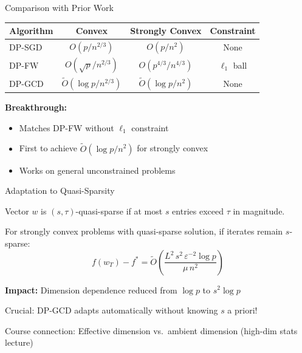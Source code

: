 \documentclass{beamer}
\begin{document}
\begin{frame}{Comparison with Prior Work}
\begin{table}
\begin{tabular}{l|c|c|c}
\textbf{Algorithm} & \textbf{Convex} & \textbf{Strongly Convex} & \textbf{Constraint} \\ \hline
DP-SGD & $O(p/n^{2/3})$ & $O(p/n^2)$ & None \\
DP-FW & $O(\sqrt{p}/n^{2/3})$ & $O(p^{4/3}/n^{4/3})$ & $\ell_1$ ball \\
\rowcolor{yellow!30}
DP-GCD & $\widetilde{O}(\log p/n^{2/3})$ & $\widetilde{O}(\log p/n^2)$ & None \\
\end{tabular}
\end{table}

\vspace{1em}

\textbf{Breakthrough:}
\begin{itemize}
\item Matches DP-FW without $\ell_1$ constraint
\item First to achieve $\widetilde{O}(\log p / n^2)$ for strongly convex
\item Works on general unconstrained problems
\end{itemize}
\end{frame}

\begin{frame}{Adaptation to Quasi-Sparsity}
\begin{definition}
Vector $w$ is $(s, \tau)$-quasi-sparse if at most $s$ entries exceed $\tau$ in magnitude.
\end{definition}

\vspace{1em}

\begin{theorem}
For strongly convex problems with quasi-sparse solution, if iterates remain $s$-sparse:
\[
f(w_T) - f^* = \widetilde{O}\!\left( \frac{L^2 \, s^2 \, \varepsilon^{-2} \log p}{\mu \, n^2} \right)
\]
\end{theorem}

\vspace{1em}

\textbf{Impact:} Dimension dependence reduced from $\log p$ to $s^2 \log p$

\vspace{0.5em}

\alert{Crucial:} DP-GCD adapts automatically without knowing $s$ a priori!

\vspace{0.3em}

\alert{Course connection:} Effective dimension vs.\ ambient dimension (high-dim stats lecture)
\end{frame}
\end{document}

